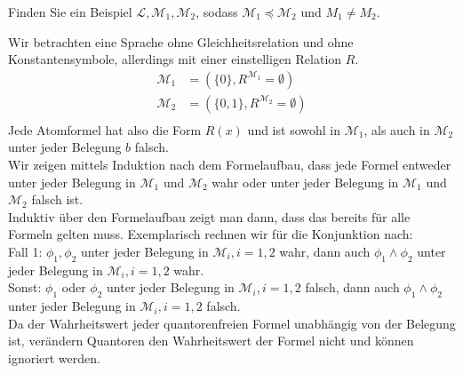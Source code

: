 
\begin{exercise}[143]
Finden Sie ein Beispiel $\mathscr{L},\mathscr{M}_1,\mathscr{M}_2$, sodass
$\mathscr{M}_1 \preccurlyeq \mathscr{M}_2$ und $M_1 \neq M_2$.
\end{exercise}


\begin{solution}
Wir betrachten eine Sprache ohne Gleichheitsrelation und ohne Konstantensymbole, allerdings
mit einer einstelligen Relation $R$.
\begin{align*}
  \mathscr{M}_1 &= (\{0\}, R^{\mathscr{M}_1}= \emptyset) \\
  \mathscr{M}_2 &= (\{0,1\}, R^{\mathscr{M}_2}= \emptyset) \\
\end{align*}
Jede Atomformel hat also die Form $R(x)$ und ist sowohl in $\mathscr{M}_1$,
als auch in $\mathscr{M}_2$ unter jeder Belegung $b$ falsch. \\
Wir zeigen mittels Induktion nach dem Formelaufbau, dass jede Formel
entweder unter jeder Belegung in $\mathscr{M}_1$ und $\mathscr{M}_2$ wahr oder
unter jeder Belegung in $\mathscr{M}_1$ und $\mathscr{M}_2$ falsch ist. \\
Induktiv über den Formelaufbau zeigt man dann, dass das bereits für alle Formeln gelten muss.
Exemplarisch rechnen wir für die Konjunktion nach: \\
Fall 1: $\phi_1,\phi_2$ unter jeder Belegung in $\mathscr{M}_i, i =1,2$ wahr,
dann auch $\phi_1 \land \phi_2$ unter jeder Belegung in $\mathscr{M}_i, i= 1,2$ wahr. \\
Sonst: $\phi_1$ oder $\phi_2$ unter jeder Belegung in $\mathscr{M}_i, i = 1,2$ falsch,
dann auch $\phi_1 \land \phi_2$ unter jeder Belegung in $\mathscr{M}_i, i=1,2$ falsch. \\
Da der Wahrheitswert jeder quantorenfreien Formel unabhängig von der Belegung ist,
verändern Quantoren den Wahrheitswert der Formel nicht und können ignoriert werden.
\end{solution}


